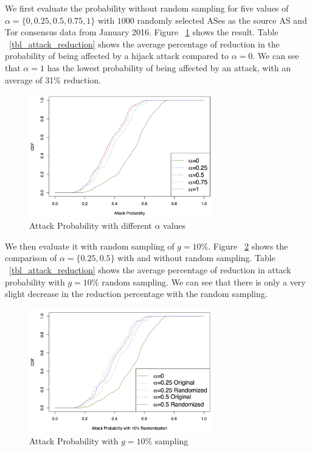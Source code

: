 We first evaluate the probability without random sampling for five values of $\alpha=\{0, 0.25, 0.5, 0.75, 1\}$ with $1000$ randomly selected ASes as the source AS and Tor consensus data from January 2016. Figure ~\ref{fig_attack} shows the result. Table ~\ref{tbl_attack_reduction} shows the average percentage of reduction in the probability of being affected by a hijack attack compared to $\alpha=0$. We can see that $\alpha=1$ has the lowest probability of being affected by an attack, with an average of 31\% reduction. 

\begin{figure}[ht!]
\centering
\includegraphics[width=80mm]{figure/attack}
\caption{Attack Probability with different $\alpha$ values \label{fig_attack}}
\end{figure}


We then evaluate it with random sampling of $g=10\%$. Figure ~\ref{fig_attack_random} shows the comparison of $\alpha=\{0.25, 0.5\}$ with and without random sampling. Table ~\ref{tbl_attack_reduction} shows the average percentage of reduction in attack probability with $g=10\%$ random sampling. We can see that there is only a very slight decrease in the reduction percentage with the random sampling. 

\begin{figure}[ht!]
\centering
\includegraphics[width=80mm]{figure/attack_randomize}
\caption{Attack Probability with $g=10\%$ sampling \label{fig_attack_random}}
\end{figure}

